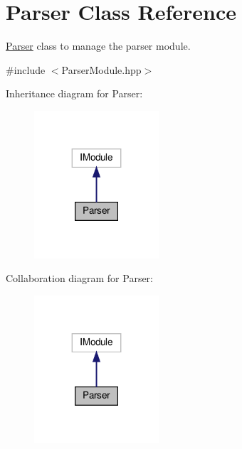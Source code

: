 \hypertarget{class_parser}{}\section{Parser Class Reference}
\label{class_parser}


\hyperlink{class_parser}{Parser} class to manage the parser module.  




{\ttfamily \#include $<$Parser\+Module.\+hpp$>$}



Inheritance diagram for Parser\+:\nopagebreak
\begin{figure}[H]
\begin{center}
\leavevmode
\includegraphics[width=131pt]{class_parser__inherit__graph}
\end{center}
\end{figure}


Collaboration diagram for Parser\+:\nopagebreak
\begin{figure}[H]
\begin{center}
\leavevmode
\includegraphics[width=131pt]{class_parser__coll__graph}
\end{center}
\end{figure}
